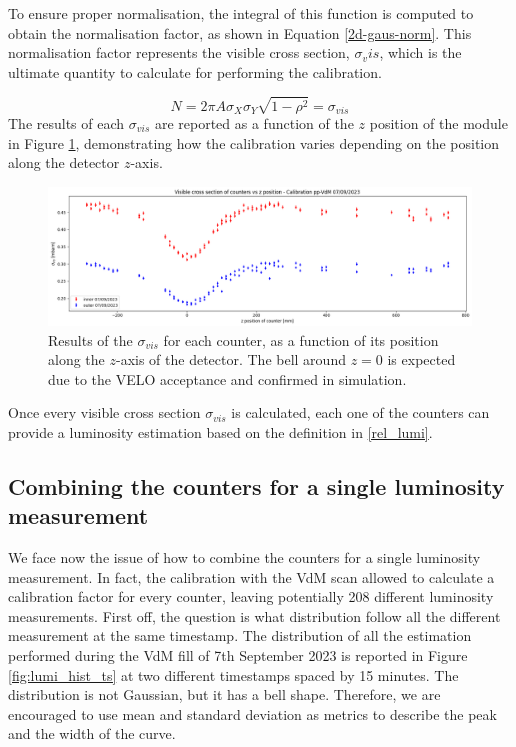  To ensure proper normalisation, the integral of this function is computed to obtain the normalisation factor, as shown in Equation \eqref{2d-gaus-norm}. This normalisation factor represents the visible cross section, $\sigma_vis$, which is the ultimate quantity to calculate for performing the calibration.

\begin{equation}
    N = 2\pi A \sigma_{X}\sigma_{Y}\sqrt {1-\rho ^{2}}=\sigma_{vis}\label{2d-gaus-norm}
\end{equation}
 The results of each $\sigma_{vis}$ are reported as a function of the $z$ position of the module in Figure \ref{fig:coefficient_pos}, demonstrating how the calibration varies depending on the position along the detector $z$-axis.

\begin{figure}
    \centering
    \includegraphics[width=\textwidth]{figures/coefficient_pos.png}
    \caption{Results of the $\sigma_{vis}$ for each counter, as a function of its position along the $z$-axis of the detector. The bell around $z=0$ is expected due to the VELO acceptance and confirmed in simulation.}
    \label{fig:coefficient_pos}
\end{figure}

Once every visible cross section $\sigma_{vis}$ is calculated, each one of the counters can provide a luminosity estimation based on the definition in \eqref{rel_lumi}.

\subsection{Combining the counters for a single luminosity measurement}
We face now the issue of how to combine the counters for a single luminosity measurement. In fact, the calibration with the VdM scan allowed to calculate a calibration factor for every counter, leaving potentially 208 different luminosity measurements. 
First off, the question is what distribution follow all the different measurement at the same timestamp. 
The distribution of all the estimation performed during the VdM fill of 7th September 2023 is reported in Figure \ref{fig:lumi_hist_ts} at two different timestamps spaced by 15 minutes. The distribution is not Gaussian, but it has a bell shape. Therefore, we are encouraged to use mean and standard deviation as metrics to describe the peak and the width of the curve. 


